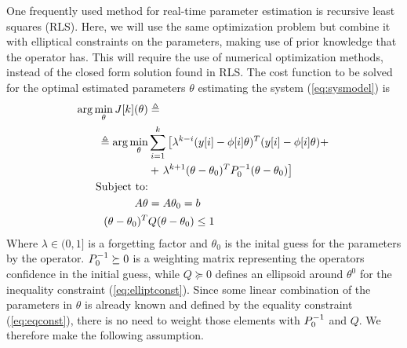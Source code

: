 One frequently used method for real-time parameter estimation is recursive least squares
(RLS)\cite{astrom_adaptive_2008}. Here, we will use the same optimization problem but
combine it with elliptical constraints on the parameters, making use of prior knowledge
that the operator has. This will require the use of numerical optimization methods, instead 
of the closed form solution found in RLS. The cost function to be solved for the optimal
estimated parameters $\theta$ estimating the system (\ref{eq:sysmodel}) is
\begin{align}
        \arg\min\limits_{\theta} J[k](\theta) &\triangleq
        \\ \triangleq \arg\min\limits_{\theta} &
            \sum\limits_{i=1}^k \left[
            \lambda^{k-i}(y[i]-\phi[i]\theta)^T(y[i]-\phi[i]\theta) + \right. \notag \\
            &+ \left. \lambda^{k+1}(\theta-\theta_0)^TP_0^{-1}(\theta-\theta_0) \right]
    \label{eq:costfunction} \\
    \text{Subject to:}& \notag \\
    A\theta &= A\theta_0 = b
    \label{eq:eqconst} \\
    (\theta-\theta_0)^T&Q(\theta-\theta_0) \leq 1
    \label{eq:elliptconst}
\end{align}
Where $\lambda \in (0,1]$ is a forgetting factor and $\theta_0$
is the inital guess for the parameters
by the operator. $P_0^{-1} \succeq 0$ is a weighting matrix representing the
operators confidence in the initial guess, while $Q \succeq 0$ defines an
ellipsoid around $\theta^0$ for the
inequality constraint (\ref{eq:elliptconst}). Since some linear combination
of the parameters in $\theta$ is already known and defined by the equality constraint
(\ref{eq:eqconst}), there is no need to weight those elements with $P_0^{-1}$ and $Q$. We therefore
make the following assumption.


